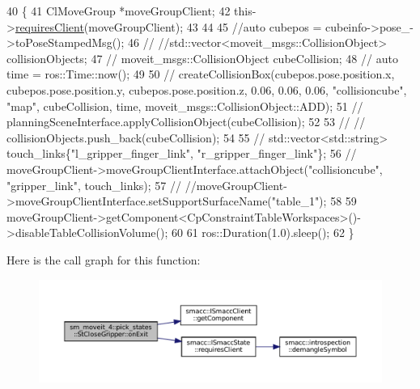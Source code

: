 \begin{DoxyCode}
40          \{
41             ClMoveGroup *moveGroupClient;
42             this->\hyperlink{classsmacc_1_1ISmaccState_a7f95c9f0a6ea2d6f18d1aec0519de4ac}{requiresClient}(moveGroupClient);
43 
44 
45             \textcolor{comment}{//auto cubepos = cubeinfo->pose\_->toPoseStampedMsg();}
46             \textcolor{comment}{// //std::vector<moveit\_msgs::CollisionObject> collisionObjects;}
47             \textcolor{comment}{// moveit\_msgs::CollisionObject cubeCollision;}
48             \textcolor{comment}{// auto time = ros::Time::now();}
49 
50             \textcolor{comment}{// createCollisionBox(cubepos.pose.position.x, cubepos.pose.position.y,
       cubepos.pose.position.z, 0.06, 0.06, 0.06, "collisioncube", "map",  cubeCollision, time, moveit\_msgs::CollisionObject::ADD);}
51             \textcolor{comment}{// planningSceneInterface.applyCollisionObject(cubeCollision);}
52 
53             \textcolor{comment}{// // collisionObjects.push\_back(cubeCollision);}
54             
55             \textcolor{comment}{// std::vector<std::string> touch\_links\{"l\_gripper\_finger\_link", "r\_gripper\_finger\_link"\};}
56             \textcolor{comment}{// moveGroupClient->moveGroupClientInterface.attachObject("collisioncube", "gripper\_link",
       touch\_links);}
57             \textcolor{comment}{// //moveGroupClient->moveGroupClientInterface.setSupportSurfaceName("table\_1");}
58             
59             moveGroupClient->getComponent<CpConstraintTableWorkspaces>()->disableTableCollisionVolume();
60 
61             ros::Duration(1.0).sleep();
62          \}
\end{DoxyCode}
Here is the call graph for this function\+:
\nopagebreak
\begin{figure}[H]
\begin{center}
\leavevmode
\includegraphics[width=350pt]{structsm__moveit__4_1_1pick__states_1_1StCloseGripper_a427f4aec6a2173899b55e6a45ca28773_cgraph}
\end{center}
\end{figure}
\mbox{\label{structsm__moveit__4_1_1pick__states_1_1StCloseGripper_af3be0f07cd47254137be3f0eb049e90f}} 
